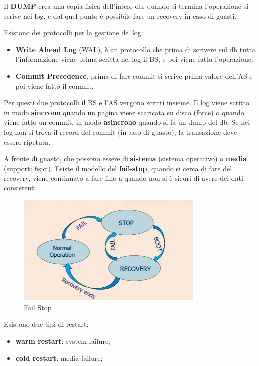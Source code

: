 \documentclass[12pt]{article}
\begin{document}
Il \textbf{DUMP} crea una copia fisica dell'intero db, quando si termina l'operazione si scrive nei log, e dal quel punto \`e possibile fare un recovery in caso di guasti.

Esistono dei protocolli per la gestione del log:
\begin{itemize}
    \item \textbf{Write Ahead Log} (WAL), \`e un protocollo che prima di scrivere sul db tutta l'informazione viene prima scritta nel log il BS, e poi viene fatta l'operazione.
    \item \textbf{Commit Precedence}, prima di fare commit si scrive prima valore dell'AS e poi viene fatto il commit.
\end{itemize}
Per questi due protocolli il BS e l'AS vengono scritti insieme. Il log viene scritto in modo \textbf{sincrono} quando un pagina viene scaricata su disco (force) o quando viene fatto un commit, in modo \textbf{asincrono} quando si fa un dump del db. Se nei log non si trova il record del commit (in caso di guasto), la transazione deve essere ripetuta.

A fronte di guasto, che possono essere di \textbf{sistema} (sistema operativo) o \textbf{media} (supporti fisici). Esiste il modello del \textbf{fail-stop}, quando si cerca di fare del recovery, viene continuato a fare fino a quando non si \`e sicuri di avere dei dati consistenti.
\begin{figure}[H]
    \centering
    \includegraphics[width=0.8\textwidth]{fail-stop.png}
    \caption{Fail Stop}
    \label{fig:fail-stop}
\end{figure}
Esistono due tipi di restart:
\begin{itemize}
    \item \textbf{warm restart}: system failure;
    \item \textbf{cold restart}: media failure;
\end{itemize}
\end{document}
